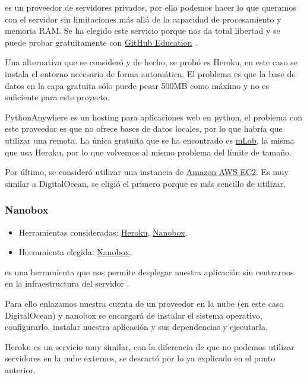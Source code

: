  es un proveedor de servidores privados, por ello podemos hacer lo que queramos con el servidor sin limitaciones más allá de la capacidad de procesamiento y memoria RAM. Se ha elegido este servicio porque nos da total libertad y se puede probar gratuitamente con \href{https://education.github.com/}{GitHub Education} \cite{docs:digitalocean}.

Una alternativa que se consideró y de hecho, se probó es Heroku, en este caso se instala el entorno necesario de forma automática. El problema es que la base de datos en la capa gratuita sólo puede pesar 500MB como máximo y no es suficiente para este proyecto.

PythonAnywhere es un hosting para aplicaciones web en python, el problema con este proveedor es que no ofrece bases de datos locales, por lo que habría que utilizar una remota. La única gratuita que se ha encontrado es \href{https://mlab.com/}{mLab}, la misma que usa Heroku, por lo que volvemos al mismo problema del límite de tamaño.

Por último, se consideró utilizar una instancia de \href{https://aws.amazon.com/es/ec2/}{Amazon AWS EC2}. Es muy similar a DigitalOcean, se eligió el primero porque es más sencillo de utilizar.

\subsubsection{Nanobox} \label{nanobox}
\begin{itemize}
	\tightlist
	\item
	Herramientas consideradas:
	\href{https://www.heroku.com/}{Heroku}, 
	\href{https://nanobox.io/}{Nanobox}.
	\item
	Herramienta elegida:
	\href{https://nanobox.io/}{Nanobox}.
\end{itemize}

 es una herramienta que nos permite desplegar nuestra aplicación sin centrarnos en la infraestructura del servidor \cite{docs:nanobox}.

Para ello enlazamos nuestra cuenta de un proveedor en la nube (en este caso DigitalOcean) y nanobox se encargará de instalar el sistema operativo, configurarlo, instalar nuestra aplicación y sus dependencias y ejecutarla.

Heroku es un servicio muy similar, con la diferencia de que no podemos utilizar servidores en la nube externos, se descartó por lo ya explicado en el punto anterior.

